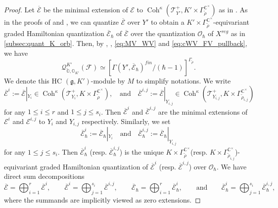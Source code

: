 \documentclass[11pt, a4paper]{amsart}
\newcommand{\C}{\mathbb{C}}
\newcommand{\g}{\mathfrak{g}}
\newcommand{\orb}{\mathbb{O}}
\newcommand{\ckorb}{\check{\orb}}
\newcommand{\cF}{\mathcal{F}}
\newcommand{\cE}{\mathcal{E}}
\newcommand{\hb}{\hbar}
\DeclareMathOperator{\Coh}{Coh}
\newcommand{\TT}{\mathscr{T}}
\newcommand{\quan}{\mathcal{Q}}
\newcommand{\cm}{\C^\times}
\newcommand{\OO}{\mathcal{O}}
\theoremstyle{definition}
\numberwithin{equation}{section}
\begin{document}
\begin{proof}
	Let $\overline{\cE}$ be the minimal extension of $\cE$ to $\Coh^\kappa(\TT^+_{Y'}, K' \times \Gamma_{\tilde{\rho}}^{\cm})$ as in . As in the proofs of  and , we can quantize $\overline{\cE}$ over $Y'$ to obtain a $K' \times \Gamma_{\tilde{\rho}}^{\cm}$-equivariant graded Hamiltonian quantization $\overline{\cE}_\hb$ of $\overline{\cE}$ over the quantization $\OO_\hb$ of $X^{reg}$ as in \cref{subsec:quant_K_orb}. Then, by , , \eqref{eq:MV_WV} and \eqref{eq:cWV_FV_pullback}, we have 
		\[\quan_{\ckorb, \orb_{K'}}^{K'}(\cF) \simeq [\Gamma(Y', \overline{\cE}_\hb)^{fin} / (\hb-1)]^{\Gamma_{\tilde{\rho}}}.\] 
	We denote this HC $(\g,K')$-module by $M$ to simplify notations. We write 
		\[ 
			\overline{\cE}^i:= \overline{\cE}|_{Y_i} \in \Coh^\kappa(\TT^+_{Y_i}, K \times \Gamma_{\tilde{\rho}}^{\cm}), 
			\quad \text{and} \quad
			\overline{\cE}^{i,j} := \overline{\cE}|_{Y_{i,j}} \in \Coh^\kappa(\TT^+_{Y_{i,j}}, K \times \Gamma_{\tilde{\rho}_{i,j}}^{\cm})\]
		for any $1 \leqslant i \leqslant r$ and $1 \leqslant j \leqslant s_i$. Then $\overline{\cE}^i$ and $\overline{\cE}^{i,j}$ are the minimal extensions of $\cE^i$ and $\cE^{i,j}$ to $Y_i$ and $Y_{i,j}$ respectively.
		Similarly, we set
		\[
			\overline{\cE}_\hb^i := \overline{\cE}_\hb|_{Y_i} \quad \text{and} \quad \overline{\cE}_\hb^{i,j} := \overline{\cE}_\hb|_{Y_{i,j}}
		\]
	for any $1 \leqslant j \leqslant s_i$. Then $\overline{\cE}_\hb^i$ (resp. $\overline{\cE}_\hb^{i,j}$) is the unique $K \times \Gamma_{\tilde{\rho}}^{\cm}$(resp. $K \times \Gamma_{\tilde{\rho}_{i,j}}^{\cm}$)-equivariant graded Hamiltonian quantization of $\overline{\cE}^i$ (resp. $\overline{\cE}^{i,j}$) over $\OO_\hb$. We have direct sum decompositions
	\[ 
		\overline{\cE} = \bigoplus_{i=1}^r \overline{\cE}^i, \qquad \overline{\cE}^i = \bigoplus_{j=1}^{s_i} \overline{\cE}^{i,j}, 
		\qquad
		\overline{\cE}_\hb = \bigoplus_{i=1}^r \overline{\cE}_\hb^i, \qquad \text{and} \qquad \overline{\cE}_\hb^i = \bigoplus_{j=1}^{s_i} \overline{\cE}_\hb^{i,j},
	\]
	where the summands are implicitly viewed as zero extensions.


\end{proof}
\end{document}
